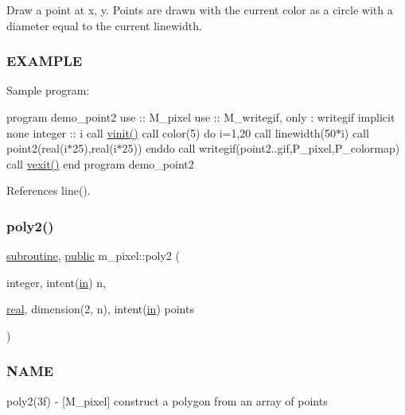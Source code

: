Draw a point at x, y. Points are drawn with the current color as a circle with a diameter equal to the current linewidth.

\subsubsection*{E\+X\+A\+M\+P\+LE}

Sample program\+:

program demo\+\_\+point2 use \+:\+: M\+\_\+pixel use \+:\+: M\+\_\+writegif, only \+: writegif implicit none integer \+:\+: i call \hyperlink{namespacem__pixel_ac03ca8f23fdadb60599b6ea4dc87a6d9}{vinit()} call color(5) do i=1,20 call linewidth(50$\ast$i) call point2(real(i$\ast$25),real(i$\ast$25)) enddo call writegif(\textquotesingle{}point2..\+gif\textquotesingle{},P\+\_\+pixel,P\+\_\+colormap) call \hyperlink{namespacem__pixel_a19ad6b65752322b0029a62cc0ebec3e8}{vexit()} end program demo\+\_\+point2 

References line().

\mbox{\label{namespacem__pixel_a996117d631dce0e92056a0c486be5109}} 
\subsubsection{\texorpdfstring{poly2()}{poly2()}}
{\footnotesize\ttfamily \hyperlink{M__stopwatch_83_8txt_acfbcff50169d691ff02d4a123ed70482}{subroutine}, \hyperlink{M__stopwatch_83_8txt_a2f74811300c361e53b430611a7d1769f}{public} m\+\_\+pixel\+::poly2 (\begin{DoxyParamCaption}\item[{integer, intent(\hyperlink{M__journal_83_8txt_afce72651d1eed785a2132bee863b2f38}{in})}]{n,  }\item[{\hyperlink{read__watch_83_8txt_abdb62bde002f38ef75f810d3a905a823}{real}, dimension(2, n), intent(\hyperlink{M__journal_83_8txt_afce72651d1eed785a2132bee863b2f38}{in})}]{points }\end{DoxyParamCaption})}



\subsubsection*{N\+A\+ME}

poly2(3f) -\/ \mbox{[}M\+\_\+pixel\mbox{]} construct a polygon from an array of points 

